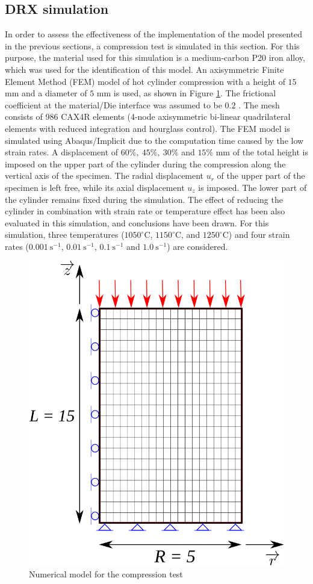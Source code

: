 \documentclass[metals,article,submit,pdftex,moreauthors]{Definitions/mdpi}
\begin{document}
\subsection{DRX simulation\label{subsec:DRXSimulation}}
In order to assess the effectiveness of the implementation of the model presented in the previous sections, a compression test is simulated in this section. For this purpose, the material used for this simulation is a medium-carbon P20 iron alloy, which was used for the identification of this model. An axisymmetric Finite Element Method (FEM) model of hot cylinder compression with a height of $15$ mm and a diameter of $5$ mm is used, as shown in Figure \ref{fig:Mesh}. The frictional coefficient at the material/Die interface was assumed to be $0.2$ \cite{zhang2019elevated,sun2020kinetique}. The mesh consists of 986 CAX4R elements (4-node axisymmetric bi-linear quadrilateral elements with reduced integration and hourglass control). The FEM model is simulated using Abaqus/Implicit due to the computation time caused by the low strain rates. A displacement of $60\%, ~45\%, ~30\%$ and $15\%$ mm of the total height is imposed on the upper part of the cylinder during the compression along the vertical axis of the specimen. The radial displacement $u_r$ of the upper part of the specimen is left free, while its axial displacement $u_z$ is imposed. The lower part of the cylinder remains fixed during the simulation. The effect of reducing the cylinder in combination with strain rate or temperature effect has been also evaluated in this simulation, and conclusions have been drawn. For this simulation, three temperatures ($1050^\circ$C, $1150^\circ$C, and $1250^\circ$C) and four strain rates ($0.001~\text{s}^{-1}$, $0.01~\text{s}^{-1}$, $0.1~\text{s}^{-1}$ and $1.0~\text{s}^{-1}$) are considered.
\begin{figure}[H]
\includegraphics[width=0.6\columnwidth]{Figures/CyCompression2}
\caption{Numerical model for the compression test}
\label{fig:Mesh}
\end{figure}
\end{document}
